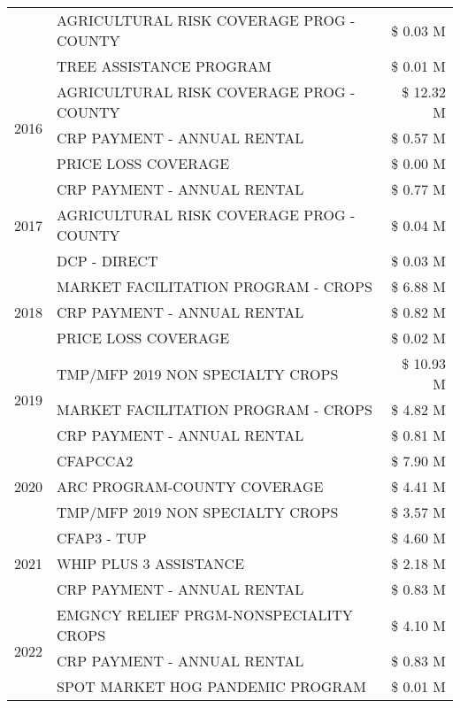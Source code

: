 \begin{tabular}{llr}
 & AGRICULTURAL RISK COVERAGE PROG - COUNTY & \$ 0.03 M \\
 & TREE ASSISTANCE PROGRAM & \$ 0.01 M \\
\cline{1-3}
\multirow[t]{3}{*}{2016} & AGRICULTURAL RISK COVERAGE PROG - COUNTY & \$ 12.32 M \\
 & CRP PAYMENT - ANNUAL RENTAL & \$ 0.57 M \\
 & PRICE LOSS COVERAGE & \$ 0.00 M \\
\cline{1-3}
\multirow[t]{3}{*}{2017} & CRP PAYMENT - ANNUAL RENTAL & \$ 0.77 M \\
 & AGRICULTURAL RISK COVERAGE PROG - COUNTY & \$ 0.04 M \\
 & DCP - DIRECT & \$ 0.03 M \\
\cline{1-3}
\multirow[t]{3}{*}{2018} & MARKET FACILITATION PROGRAM - CROPS & \$ 6.88 M \\
 & CRP PAYMENT - ANNUAL RENTAL & \$ 0.82 M \\
 & PRICE LOSS COVERAGE & \$ 0.02 M \\
\cline{1-3}
\multirow[t]{3}{*}{2019} & TMP/MFP 2019 NON SPECIALTY CROPS & \$ 10.93 M \\
 & MARKET FACILITATION PROGRAM - CROPS & \$ 4.82 M \\
 & CRP PAYMENT - ANNUAL RENTAL & \$ 0.81 M \\
\cline{1-3}
\multirow[t]{3}{*}{2020} & CFAPCCA2 & \$ 7.90 M \\
 & ARC PROGRAM-COUNTY COVERAGE & \$ 4.41 M \\
 & TMP/MFP 2019 NON SPECIALTY CROPS & \$ 3.57 M \\
\cline{1-3}
\multirow[t]{3}{*}{2021} & CFAP3 - TUP & \$ 4.60 M \\
 & WHIP PLUS 3 ASSISTANCE & \$ 2.18 M \\
 & CRP PAYMENT - ANNUAL RENTAL & \$ 0.83 M \\
\cline{1-3}
\multirow[t]{3}{*}{2022} & EMGNCY RELIEF PRGM-NONSPECIALITY CROPS & \$ 4.10 M \\
 & CRP PAYMENT - ANNUAL RENTAL & \$ 0.83 M \\
 & SPOT MARKET HOG PANDEMIC PROGRAM & \$ 0.01 M \\
\cline{1-3}
\bottomrule
\end{tabular}
